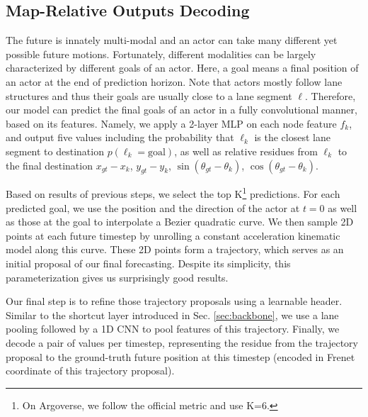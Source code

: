 \subsection{Map-Relative Outputs Decoding}
\label{sec:output}

The future is innately multi-modal and an actor can take many different yet possible
future motions. Fortunately, different modalities can be largely characterized by
different goals of an actor. Here, a goal means a
final position of an actor at the end of prediction horizon. Note that actors
mostly follow lane structures and thus their goals are usually close to a lane
segment $\ell$. Therefore, our model can predict the final goals of an actor in a
fully convolutional manner, based on its \ROI features. Namely, we apply a
2-layer MLP on each node feature $f_k$, and output five values including the
probability that $\ell_k$ is the closest lane segment to destination 
$p(\ell_k=\text{goal})$, as well as relative residues from $\ell_k$ to the final
destination $x_{gt} - x_{k}$, $y_{gt} - y_{k}$, $\sin(\theta_{gt} - \theta_k)$,
$\cos(\theta_{gt} - \theta_k)$.

Based on results of previous steps, we select the top K\footnote{On
Argoverse, we follow the official metric and use K=6.} predictions.
For each predicted goal, we use the position and the direction of the actor at
$t=0$ as well as those at the goal to interpolate a Bezier quadratic curve.
We then sample 2D points at each future timestep by unrolling a constant 
acceleration kinematic model along this curve.
These 2D points form a trajectory, which serves as an initial proposal of our final forecasting.
Despite its simplicity, this parameterization gives us surprisingly good results.

Our final step is to refine those trajectory proposals using a learnable header. 
Similar to the shortcut layer introduced in Sec.
\ref{sec:backbone}, we use a lane pooling followed by a 1D CNN to 
pool features of this trajectory. 
Finally, we decode a pair of values per timestep, representing the residue from the trajectory proposal to the
ground-truth future position at this timestep (encoded in Frenet coordinate of
this trajectory proposal). 



